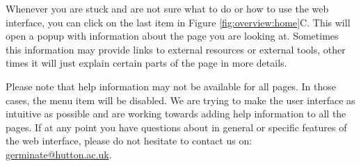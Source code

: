 Whenever you are stuck and are not sure what to do or how to use the web interface, you can click on the last item in Figure \ref{fig:overview:home}C. This will open a popup with information about the page you are looking at. Sometimes this information may provide links to external resources or external tools, other times it will just explain certain parts of the page in more details.

Please note that help information may not be available for all pages. In those cases, the menu item will be disabled. We are trying to make the user interface as intuitive as possible and are working towards adding help information to all the pages. If at any point you have questions about {\germinate} in general or specific features of the web interface, please do not hesitate to contact us on: \href{mailto:germinate@hutton.ac.uk}{germinate@hutton.ac.uk}.